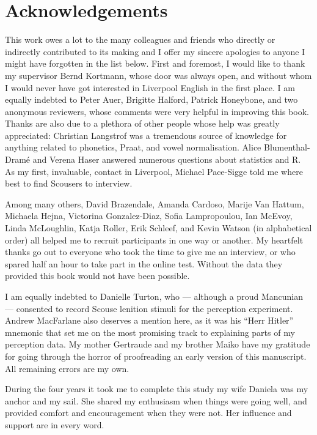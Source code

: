 \chapter*{Acknowledgements}

This work owes a lot to the many colleagues and friends who directly or indirectly contributed to its making and I offer my sincere apologies to anyone I might have forgotten in the list below.
First and foremost, I would like to thank my supervisor Bernd Kortmann, whose door was always open, and without whom I would never have got interested in Liverpool English in the first place.
I am equally indebted to Peter Auer, Brigitte Halford, Patrick Honeybone, and two anonymous reviewers, whose comments were very helpful in improving this book.
Thanks are also due to a plethora of other people whose help was greatly appreciated:
Christian Langstrof was a tremendous source of knowledge for anything related to phonetics, Praat, and vowel normalisation.
Alice Blumenthal-Dramé and Verena Haser answered numerous questions about statistics and R.
As my first, invaluable, contact in Liverpool, Michael Pace-Sigge told me where best to find Scousers to interview.

Among many others, David Brazendale, Amanda Cardoso, Marije Van Hattum, Michaela Hejna, Victorina Gonzalez-Diaz, Sofia Lampropoulou, Ian McEvoy, Linda McLoughlin, Katja Roller, Erik Schleef, and Kevin Watson (in alphabetical order) all helped me to recruit participants in one way or another.
My heartfelt thanks go out to everyone who took the time to give me an interview, or who spared half an hour to take part in the online test.
Without the data they provided this book would not have been possible.

I am equally indebted to Danielle Turton, who --- although a proud Mancunian --- consented to record Scouse lenition stimuli for the perception experiment.
Andrew MacFarlane also deserves a mention here, as it was his ``Herr Hitler'' mnemonic that set me on the most promising track to explaining parts of my perception data.
My mother Gertraude and my brother Maiko have my gratitude for going through the horror of proofreading an early version of this manuscript.
All remaining errors are my own.

During the four years it took me to complete this study my wife Daniela was my anchor and my sail.
She shared my enthusiasm when things were going well, and provided comfort and encouragement when they were not.
Her influence and support are in every word.